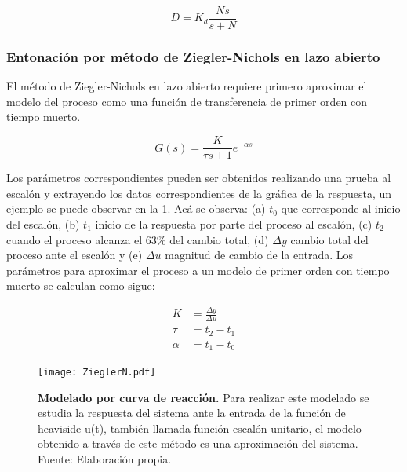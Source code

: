                 \begin{equation}\label{eq:Daproximacion}
                    D = K_d \frac{N s}{s + N}
                \end{equation}

        \subsubsection{Entonación por método de Ziegler-Nichols en lazo abierto}
			
            El método de Ziegler-Nichols en lazo abierto requiere primero aproximar el modelo del proceso como una función de transferencia de primer orden con tiempo muerto.
            
            \begin{equation}\label{eq:firstorderProcess}
                G(s) = \frac{K}{\tau s + 1} e^{-\alpha s}
            \end{equation}
            
            Los parámetros correspondientes pueden ser obtenidos realizando una prueba al escalón y extrayendo los datos correspondientes de la gráfica de la respuesta, un ejemplo se puede observar en la \cref{fig:ZNtest}. Acá se observa: (a) $t_{0}$ que corresponde al inicio del escalón, (b) $t_{1}$ inicio de la respuesta por parte del proceso al escalón, (c) $t_{2}$ cuando el proceso alcanza el 63\% del cambio total, (d) $\Delta y$ cambio total del proceso ante el escalón y (e) $\Delta u$ magnitud de cambio de la entrada. Los parámetros para aproximar el proceso a un modelo de primer orden con tiempo muerto se calculan como sigue:
            
            \begin{align}\label{eq:parametros}
                K &= \frac{\Delta y}{\Delta u}\\
                \tau &= t_{2} - t_{1}\\
                \alpha &= t_{1} - t_{0}
            \end{align}
            
            \begin{figure}[htb]
                \centering
                \texttt{[image: ZieglerN.pdf]}
                \caption[Modelado por curva de reacción]{\textbf{Modelado por curva de reacción.} Para realizar este modelado se estudia la respuesta del sistema ante la entrada de la función de heaviside u(t), también llamada función escalón unitario, el modelo obtenido a través de este método es una aproximación del sistema. Fuente: Elaboración propia.} 
                \label{fig:ZNtest}
            \end{figure}
            
